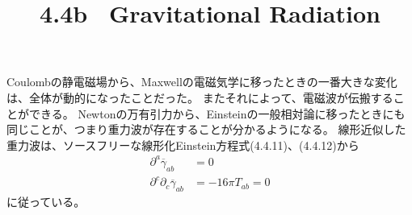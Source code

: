 \documentclass[a4paper]{jsarticle}
\title{4.4b \ Gravitational Radiation}
\begin{document}
\maketitle

Coulombの静電磁場から、Maxwellの電磁気学に移ったときの一番大きな変化は、全体が動的になったことだった。
またそれによって、電磁波が伝搬することができる。
Newtonの万有引力から、Einsteinの一般相対論に移ったときにも同じことが、つまり重力波が存在することが分かるようになる。
線形近似した重力波は、ソースフリーな線形化Einstein方程式(4.4.11)、(4.4.12)から
\begin{align}
	\partial^a \overline{\gamma}_{ab} &= 0 \tag{4.4.25} \\
	\partial^c \partial_c \overline{\gamma}_{ab} &= -16 \pi T_{ab} = 0 \tag{4.4.26}
\end{align}
に従っている。
\end{document}
